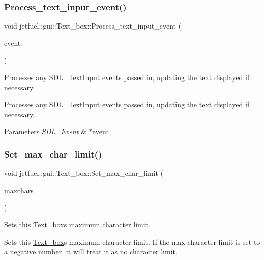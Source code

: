 \subsubsection{\texorpdfstring{Process\+\_\+text\+\_\+input\+\_\+event()}{Process\_text\_input\_event()}}
{\footnotesize\ttfamily void jetfuel\+::gui\+::\+Text\+\_\+box\+::\+Process\+\_\+text\+\_\+input\+\_\+event (\begin{DoxyParamCaption}\item[{S\+D\+L\+\_\+\+Event $\ast$}]{event }\end{DoxyParamCaption})}



Processes any S\+D\+L\+\_\+\+Text\+Input events passed in, updating the text displayed if necessary. 

Processes any S\+D\+L\+\_\+\+Text\+Input events passed in, updating the text displayed if necessary.


\begin{DoxyParams}{Parameters}
{\em S\+D\+L\+\_\+\+Event} & $\ast$event \\
\hline
\end{DoxyParams}
\mbox{\label{classjetfuel_1_1gui_1_1Text__box_a818042653f8a73a40060d978d1a1dbd8}} 
\subsubsection{\texorpdfstring{Set\+\_\+max\+\_\+char\+\_\+limit()}{Set\_max\_char\_limit()}}
{\footnotesize\ttfamily void jetfuel\+::gui\+::\+Text\+\_\+box\+::\+Set\+\_\+max\+\_\+char\+\_\+limit (\begin{DoxyParamCaption}\item[{int}]{maxchars }\end{DoxyParamCaption})\hspace{0.3cm}{\ttfamily [inline]}}



Sets this \hyperlink{classjetfuel_1_1gui_1_1Text__box}{Text\+\_\+box}\textquotesingle{}s maximum character limit. 

Sets this \hyperlink{classjetfuel_1_1gui_1_1Text__box}{Text\+\_\+box}\textquotesingle{}s maximum character limit. If the max character limit is set to a negative number, it will treat it as no character limit.


